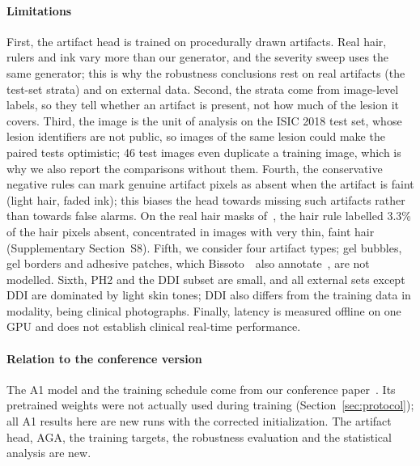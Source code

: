 
\paragraph{Limitations}
First, the artifact head is trained on procedurally drawn artifacts. Real hair, rulers and ink vary more than our generator, and the severity sweep uses the same generator; this is why the robustness conclusions rest on real artifacts (the test-set strata) and on external data. Second, the strata come from image-level labels, so they tell whether an artifact is present, not how much of the lesion it covers. Third, the image is the unit of analysis on the ISIC 2018 test set, whose lesion identifiers are not public, so images of the same lesion could make the paired tests optimistic; 46 test images even duplicate a training image, which is why we also report the comparisons without them. Fourth, the conservative negative rules can mark genuine artifact pixels as absent when the artifact is faint (light hair, faded ink); this biases the head towards missing such artifacts rather than towards false alarms. On the real hair masks of~\cite{hossain2023hairmask}, the hair rule labelled 3.3\% of the hair pixels absent, concentrated in images with very thin, faint hair (Supplementary Section~S8). Fifth, we consider four artifact types; gel bubbles, gel borders and adhesive patches, which Bissoto~\etal\ also annotate~\cite{bissoto2020debiasing}, are not modelled. Sixth, PH2 and the DDI subset are small, and all external sets except DDI are dominated by light skin tones; DDI also differs from the training data in modality, being clinical photographs. Finally, latency is measured offline on one GPU and does not establish clinical real-time performance.

\paragraph{Relation to the conference version}
The A1 model and the training schedule come from our conference paper~\cite{iceeis2026own}. Its pretrained weights were not actually used during training (Section~\ref{sec:protocol}); all A1 results here are new runs with the corrected initialization. The artifact head, AGA, the training targets, the robustness evaluation and the statistical analysis are new. 
